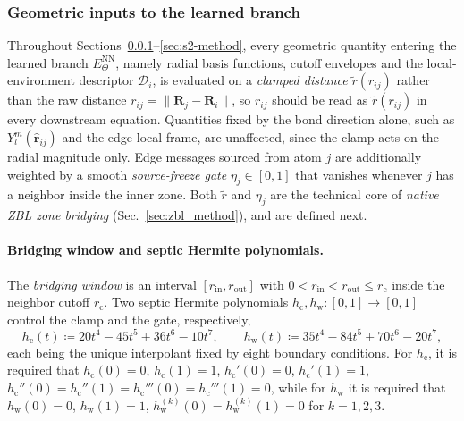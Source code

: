 \subsubsection{Geometric inputs to the learned branch}
\label{sec:geom-inputs}

Throughout Sections~\ref{sec:geom-inputs}--\ref{sec:s2-method}, every geometric quantity entering the learned branch $E_{\Theta}^{\mathrm{NN}}$, namely radial basis functions, cutoff envelopes and the local-environment descriptor $\mathcal{D}_i$, is evaluated on a \emph{clamped distance} $\widetilde{r}(r_{ij})$ rather than the raw distance $r_{ij}=\|\mathbf{R}_j-\mathbf{R}_i\|$, so $r_{ij}$ should be read as $\widetilde{r}(r_{ij})$ in every downstream equation.
Quantities fixed by the bond direction alone, such as $Y_l^m(\widehat{\mathbf{r}}_{ij})$ and the edge-local frame, are unaffected, since the clamp acts on the radial magnitude only.
Edge messages sourced from atom $j$ are additionally weighted by a smooth \emph{source-freeze gate} $\eta_j\in[0,1]$ that vanishes whenever $j$ has a neighbor inside the inner zone.
Both $\widetilde{r}$ and $\eta_j$ are the technical core of \emph{native ZBL zone bridging} (Sec.~\ref{sec:zbl_method}), and are defined next.

\paragraph{Bridging window and septic Hermite polynomials.}
The \emph{bridging window} is an interval $[r_{\mathrm{in}},r_{\mathrm{out}}]$ with $0<r_{\mathrm{in}}<r_{\mathrm{out}}\le r_{\mathrm{c}}$ inside the neighbor cutoff $r_{\mathrm{c}}$.
Two septic Hermite polynomials
$h_{\mathrm{c}},h_{\mathrm{w}}:[0,1]\to[0,1]$ control the clamp and the gate,
respectively,
\begin{equation}
    h_{\mathrm{c}}(t)\coloneqq 20t^4-45t^5+36t^6-10t^7,
    \qquad
    h_{\mathrm{w}}(t)\coloneqq 35t^4-84t^5+70t^6-20t^7,
    \label{eq:dpa4-hermite}
\end{equation}
each being the unique interpolant fixed by eight boundary conditions.
For $h_{\mathrm{c}}$, it is required that $h_{\mathrm{c}}(0)=0$, $h_{\mathrm{c}}(1)=1$,
$h_{\mathrm{c}}'(0)=0$, $h_{\mathrm{c}}'(1)=1$,
$h_{\mathrm{c}}''(0)=h_{\mathrm{c}}''(1)=h_{\mathrm{c}}'''(0)=h_{\mathrm{c}}'''(1)=0$, 
while for
$h_{\mathrm{w}}$
it is required that $h_{\mathrm{w}}(0)=0$, $h_{\mathrm{w}}(1)=1$,
$h_{\mathrm{w}}^{(k)}(0)=h_{\mathrm{w}}^{(k)}(1)=0$ for $k=1,2,3$.

